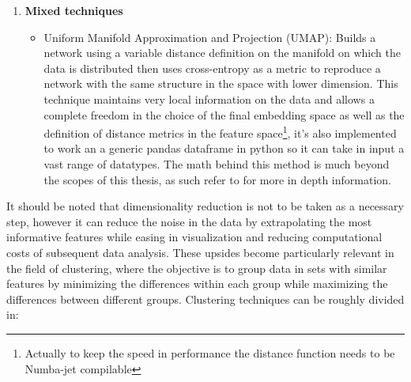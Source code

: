 \begin{enumerate}
\item \textbf{Mixed techniques}
	\begin{itemize}	
		\item Uniform Manifold Approximation and Projection (UMAP): Builds a network using a variable distance definition on the manifold on which the data is distributed then uses cross-entropy as a metric to reproduce a network with the same structure in the space with lower dimension. This technique maintains very local information on the data and allows a complete freedom in the choice of the final embedding space as well as the definition of distance metrics in the feature space\footnote{Actually to keep the speed in performance the distance function needs to be Numba-jet compilable}, it's also implemented to work an a generic pandas dataframe in python so it can take in input a vast range of datatypes. The math behind this method is much beyond the scopes of this thesis, as such refer to \cite{UMAP} for more in depth information. 
	\end{itemize}
\end{enumerate}

It should be noted that dimensionality reduction is not to be taken as a necessary step, however it can reduce the noise in the data by extrapolating the most informative features while easing in visualization and reducing computational costs of subsequent data analysis. These upsides become particularly relevant in the field of clustering, where the objective is to group data in sets with similar features by minimizing the differences within each group while maximizing the differences between different groups. Clustering techniques can be roughly divided in:

